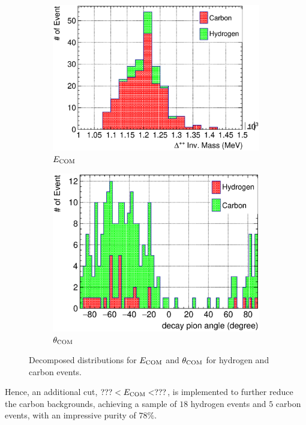      \begin{figure}
     \begin{subfigure}[b]{\dbfigwid\textwidth}
          \centering
          \includegraphics[width=\textwidth]{figures/perf/tki/SFGpTPCmu_edelta_stack_al14.eps}
          \caption{$E_{\textrm{COM}}$}
          \label{subfig:hsel-com-edelta}
     \end{subfigure}
     \begin{subfigure}[b]{\dbfigwid\textwidth}
          \centering
          \includegraphics[width=\textwidth]{figures/perf/tki/SFGpTPCmu_dang_stack_al15.eps}
          \caption{$\theta_{\textrm{COM}}$}
          \label{subfig:hsel-com-theta}
     \end{subfigure}
     \caption{Decomposed distributions for $E_{\textrm{COM}}$ and $\theta_{\textrm{COM}}$ for hydrogen and carbon events.}
     \label{fig:hsel-com-decomp}
     \end{figure}
     Hence, an additional cut, $???<E_{\textrm{COM}}<???$, is implemented to further reduce the carbon backgrounds, achieving a sample of $18$ hydrogen events and $5$ carbon events, with an impressive purity of $78\%$.

